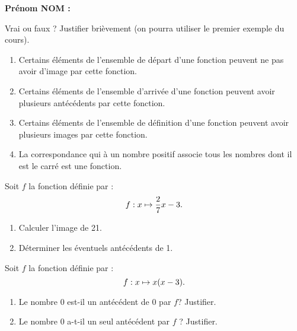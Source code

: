 \documentclass[a4paper,11pt,DIV15,BCOR0mm]{scrartcl}
\begin{document}
\noindent\textbf{Prénom NOM : }
\begin{exercice}[cours]
Vrai ou faux ? Justifier brièvement (on pourra utiliser le premier
exemple du cours).
\begin{enumerate}
  \item Certains éléments de l'ensemble de départ d'une fonction peuvent
  ne pas avoir d'image par cette fonction.
  \vfill
  \item Certains éléments de l'ensemble d'arrivée d'une fonction peuvent
  avoir plusieurs antécédents par cette fonction.
  \vfill  
  \item Certains éléments de l'ensemble de définition d'une fonction 
  peuvent avoir plusieurs images par cette fonction.
  \vfill  
  \item La correspondance qui à un nombre positif associe tous 
  les nombres dont il est le carré est une fonction.
\end{enumerate}
\end{exercice}
\vfill
\begin{exercice}
 Soit $f$ la fonction définie par :
\[
f:x\mapsto \frac27 x-3.
\]
\begin{enumerate}
  \item Calculer l'image de 21.
  \vfill
  \item Déterminer les éventuels antécédents de 1.
  \vfill
  \vfill 
  \vfill
\end{enumerate}

\end{exercice}

\begin{exercice}
Soit $f$ la fonction définie par :
\[
f:x\mapsto x(x-3).
\]
\begin{enumerate}
  \item Le nombre 0 est-il un antécédent de 0 par $f$? Justifier.
  \vfill
  \item Le nombre 0 a-t-il un seul antécédent par $f$ ? Justifier.
\end{enumerate}
\end{exercice}
\vfill
\end{document}
